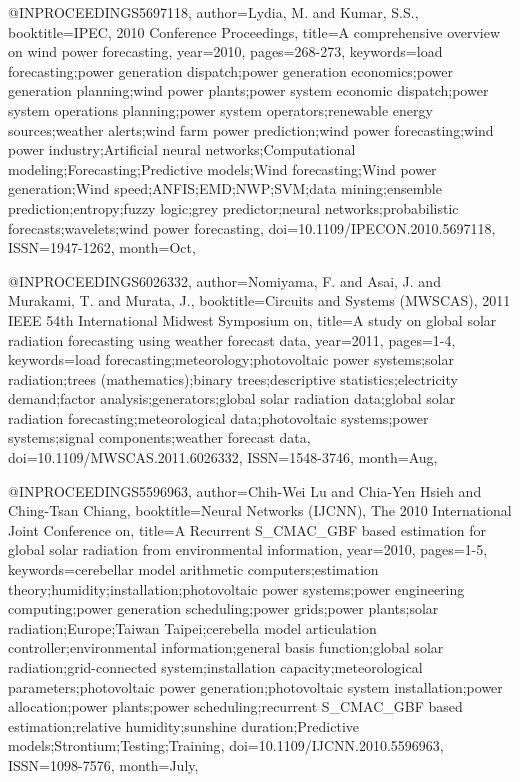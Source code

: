 
@INPROCEEDINGS{5697118, 
author={Lydia, M. and Kumar, S.S.}, 
booktitle={IPEC, 2010 Conference Proceedings}, 
title={A comprehensive overview on wind power forecasting}, 
year={2010}, 
pages={268-273}, 
keywords={load forecasting;power generation dispatch;power generation economics;power generation planning;wind power plants;power system economic dispatch;power system operations planning;power system operators;renewable energy sources;weather alerts;wind farm power prediction;wind power forecasting;wind power industry;Artificial neural networks;Computational modeling;Forecasting;Predictive models;Wind forecasting;Wind power generation;Wind speed;ANFIS;EMD;NWP;SVM;data mining;ensemble prediction;entropy;fuzzy logic;grey predictor;neural networks;probabilistic forecasts;wavelets;wind power forecasting}, 
doi={10.1109/IPECON.2010.5697118}, 
ISSN={1947-1262}, 
month={Oct},}

@INPROCEEDINGS{6026332, 
author={Nomiyama, F. and Asai, J. and Murakami, T. and Murata, J.}, 
booktitle={Circuits and Systems (MWSCAS), 2011 IEEE 54th International Midwest Symposium on}, 
title={A study on global solar radiation forecasting using weather forecast data}, 
year={2011}, 
pages={1-4}, 
keywords={load forecasting;meteorology;photovoltaic power systems;solar radiation;trees (mathematics);binary trees;descriptive statistics;electricity demand;factor analysis;generators;global solar radiation data;global solar radiation forecasting;meteorological data;photovoltaic systems;power systems;signal components;weather forecast data}, 
doi={10.1109/MWSCAS.2011.6026332}, 
ISSN={1548-3746}, 
month={Aug},}

@INPROCEEDINGS{5596963, 
author={Chih-Wei Lu and Chia-Yen Hsieh and Ching-Tsan Chiang}, 
booktitle={Neural Networks (IJCNN), The 2010 International Joint Conference on}, 
title={A Recurrent S_CMAC_GBF based estimation for global solar radiation from environmental information}, 
year={2010}, 
pages={1-5}, 
keywords={cerebellar model arithmetic computers;estimation theory;humidity;installation;photovoltaic power systems;power engineering computing;power generation scheduling;power grids;power plants;solar radiation;Europe;Taiwan Taipei;cerebella model articulation controller;environmental information;general basis function;global solar radiation;grid-connected system;installation capacity;meteorological parameters;photovoltaic power generation;photovoltaic system installation;power allocation;power plants;power scheduling;recurrent S_CMAC_GBF based estimation;relative humidity;sunshine duration;Predictive models;Strontium;Testing;Training}, 
doi={10.1109/IJCNN.2010.5596963}, 
ISSN={1098-7576}, 
month={July},}

